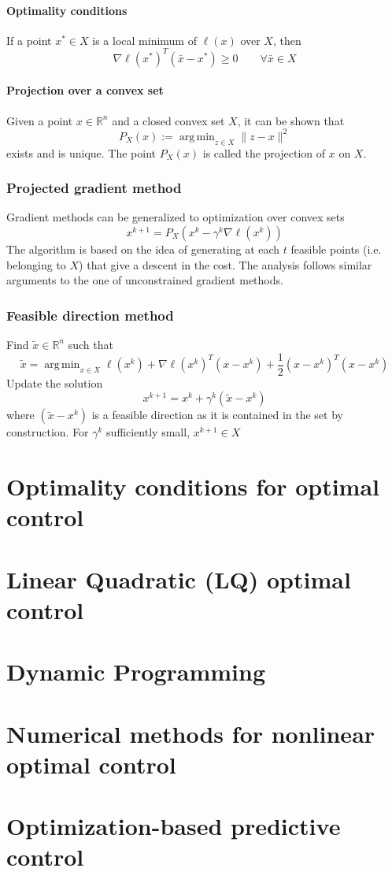 \documentclass{book}
\DeclareMathOperator*{\argmin}{arg\,min}
\newcommand{\R}{\mathbb{R}}
\begin{document}
\subsubsection{Optimality conditions}
If a point $x^* \in X$ is a local minimum of $\ell(x)$ over $X$, then 
\[
    \nabla\ell(x^*)^T(\bar{x}-x^*)\geq 0 \qquad \forall\bar{x}\in X
\]
\subsubsection{Projection over a convex set}
Given a point $x\in\R^n$ and a closed convex set $X$, it can be shown that 
\[
    P_X(x) := \argmin_{z\in X}\|z-x\|^2
\]
exists and is unique. The point $P_X(x)$ is called the projection of $x$ on $X$.
\subsection{Projected gradient method}
Gradient methods can be generalized to optimization over convex sets 
\[
    x^{k+1}=P_X(x^k-\gamma^k\nabla\ell(x^k))
\]
The algorithm is based on the idea of generating at each $t$ feasible points (i.e. belonging to $X$) that give a descent in the cost. The analysis follows similar arguments to the one of unconstrained gradient methods.

\subsection{Feasible direction method}
Find $\tilde{x}\in\R^n$ such that 
\[
    \tilde{x} = \argmin_{x\in X} \ell(x^k)+\nabla\ell(x^k)^T(x-x^k)+\displaystyle\frac{1}{2}(x-x^k)^T(x-x^k)
\]
Update the solution 
\[
    x^{k+1}=x^k+\gamma^k(\tilde{x}-x^k)
\]
where $(\tilde{x}-x^k)$ is a feasible direction as it is contained in the set by construction. For $\gamma^k$ sufficiently small, $x^{k+1}\in X$






\chapter{Optimality conditions for optimal control}





\chapter{Linear Quadratic (LQ) optimal control}


\chapter{Dynamic Programming}



\chapter{Numerical methods for nonlinear optimal control}




\chapter{Optimization-based predictive control}
\end{document}
